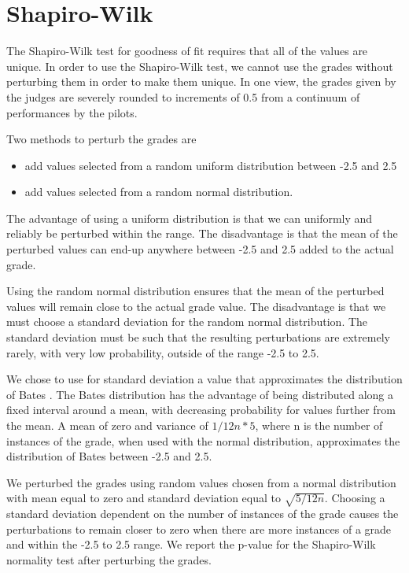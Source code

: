 \section{Shapiro-Wilk}

The Shapiro-Wilk test for goodness of fit requires that all of the values
are unique. In order to use the Shapiro-Wilk test, we
cannot use the grades without perturbing them in order to make them unique.
In one view, the grades given by the judges are severely rounded to increments
of 0.5 from a continuum of performances by the pilots.

Two methods to perturb the grades are
\begin{itemize}
\item add values selected from a random uniform distribution between -2.5 and
2.5
\item add values selected from a random normal distribution.
\end{itemize}

The advantage of using a uniform distribution is that we can uniformly and
reliably be perturbed within the range. The disadvantage is that the mean
of the perturbed values can end-up anywhere between -2.5 and 2.5 added to
the actual grade.

Using the random normal distribution ensures that the mean of the perturbed
values will remain close to the actual grade value. The disadvantage is that
we must choose a standard deviation for the random normal distribution.
The standard deviation must be such that the resulting perturbations are
extremely rarely, with very low probability, outside of the range -2.5 to
2.5.

We chose to use for standard deviation a value that approximates the
distribution of Bates . The Bates distribution has the
advantage of being distributed along a fixed interval around a mean, with
decreasing probability for values further from the mean.
A mean of zero and variance of $1/12n * 5$,
where n is the number of instances of the grade, when used
with the normal distribution, approximates the distribution of Bates between
-2.5 and 2.5.

We perturbed the grades using random values chosen from a normal distribution
with mean equal to zero and standard deviation equal to $\sqrt{5/12n}$.
Choosing a standard deviation dependent on the number of instances
of the grade causes the perturbations to remain closer to zero when there
are more instances of a grade and within the -2.5 to 2.5 range.
We report the p-value for the Shapiro-Wilk normality test after perturbing
the grades.
